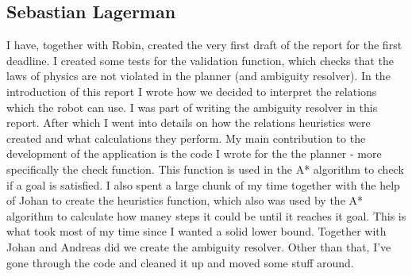 \subsection*{Sebastian Lagerman}
I have, together with Robin, created the very first draft of the report for the first deadline.
\newline
\newline
I created some tests for the validation function, which checks that the laws of physics are not violated in the planner (and ambiguity resolver).
\newline
\newline
In the introduction of this report I wrote how we decided to interpret the relations which the robot can use.
I was part of writing the ambiguity resolver in this report.
After which I went into details on how the relations heuristics were created and what calculations they perform.
\newline
\newline
My main contribution to the development of the application is the code I wrote for the the planner - more specifically the check function.
This function is used in the A* algorithm to check if a goal is satisfied.
I also spent a large chunk of my time together with the help of Johan to create the heuristics function, which also was used by the A* algorithm to calculate how maney steps it could be until it reaches it goal.
This is what took most of my time since I wanted a solid lower bound.
Together with Johan and Andreas did we create the ambiguity resolver.
Other than that, I've gone through the code and cleaned it up and moved some stuff around.


